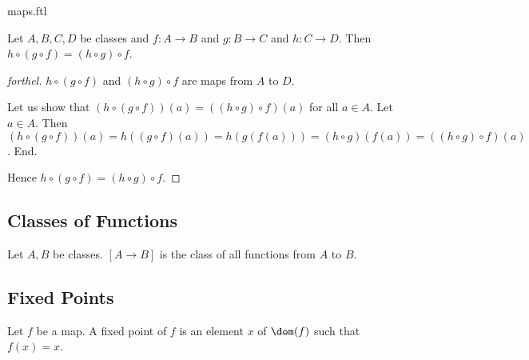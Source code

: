 \documentclass{naproche-library}
\begin{document}
\begin{smodule}{maps.ftl}
  \begin{proposition}[forthel,id=FOUNDATIONS_06_6866147389472768,printid]
    Let $A, B, C, D$ be classes and $f : A \to B$ and $g : B \to C$ and $h : C \to D$.
    Then $h \circ (g \circ f) = (h \circ g) \circ f$.
  \end{proposition}
  \begin{proof}[forthel]
    $h \circ (g \circ f)$ and $(h \circ g) \circ f$ are maps from $A$ to $D$.

    Let us show that $(h \circ (g \circ f))(a) = ((h \circ g) \circ f)(a)$ for all $a \in A$.
      Let $a \in A$.
      Then $(h \circ (g \circ f))(a)
        = h((g \circ f)(a))
        = h(g(f(a)))
        = (h \circ g)(f(a))
        = ((h \circ g) \circ f)(a)$.
    End.

    Hence $h \circ (g \circ f) = (h \circ g) \circ f$.
  \end{proof}


  \subsection*{Classes of Functions}

  \begin{definition}[forthel,id=FOUNDATIONS_06_5119110467813376,printid]
    Let $A, B$ be classes.
    $[A \to B]$ is the class of all functions from $A$ to $B$.
  \end{definition}


  \subsection*{Fixed Points}

  \begin{definition}[forthel,id=FOUNDATIONS_06_2177076576649216,printid]
    Let $f$ be a map.
    A fixed point of $f$ is an element $x$ of $\dom(f)$ such that $f(x) = x$.
  \end{definition}
\end{smodule}
\end{document}
